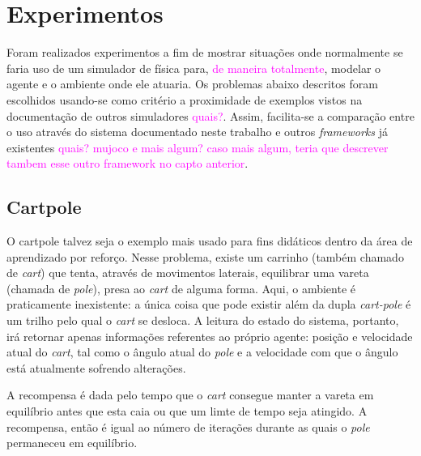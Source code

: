 \documentclass[cic,tc]{iiufrgs}
\newcommand\bruno[1]{\textcolor{magenta}{#1}}
\begin{document}
\chapter{Experimentos}
Foram realizados experimentos a fim de mostrar situações onde normalmente se faria uso de um simulador de
física para, \bruno{de maneira totalmente}, modelar o agente e o ambiente onde ele atuaria. Os problemas abaixo descritos foram escolhidos
usando-se como critério a proximidade de exemplos vistos na documentação de outros simuladores \bruno{quais?}. Assim, facilita-se
a comparação entre o uso através do sistema documentado neste trabalho e outros \textit{frameworks} já existentes \bruno{quais? mujoco e mais algum? caso mais algum, teria que descrever tambem esse outro framework no capto anterior}.

\section{Cartpole}
O cartpole talvez seja o exemplo mais usado para fins didáticos dentro da área de aprendizado por reforço. Nesse problema,
existe um carrinho (também chamado de \textit{cart}) que tenta, através de movimentos laterais, equilibrar uma
vareta (chamada de \textit{pole}), presa ao \textit{cart} de alguma forma. Aqui, o ambiente é praticamente inexistente:
a única coisa que pode existir além da dupla \textit{cart-pole} é um trilho pelo qual o \textit{cart} se desloca.
A leitura do estado do sistema, portanto, irá retornar apenas informações referentes ao próprio agente: posição e velocidade
atual do \textit{cart}, tal como o ângulo atual do \textit{pole} e a velocidade com que o ângulo está atualmente sofrendo alterações. \par
A recompensa é dada pelo tempo que o \textit{cart} consegue manter a vareta em equilíbrio antes que esta caia ou
que um limte de tempo seja atingido. A recompensa, então é igual ao número de iterações durante as quais o \textit{pole}
permaneceu em equilíbrio.
\end{document}
